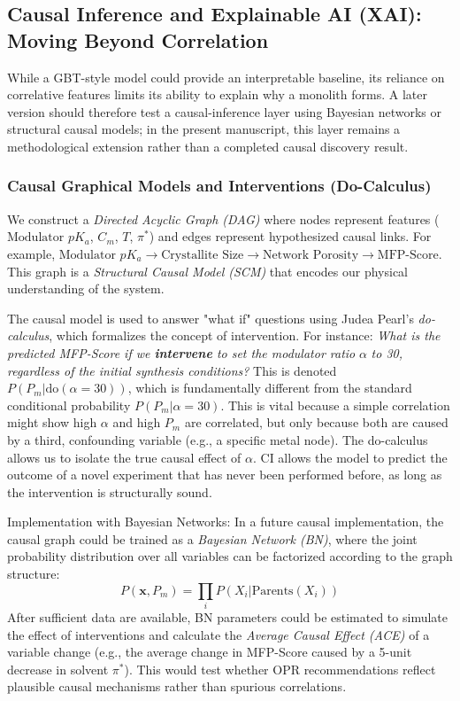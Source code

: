 \documentclass[12pt,a4paper]{article}
\begin{document}
\subsection{Causal Inference and Explainable AI (XAI): Moving Beyond Correlation}

While a GBT-style model could provide an interpretable baseline, its reliance on correlative features limits its ability to explain why a monolith forms. A later version should therefore test a causal-inference layer using Bayesian networks or structural causal models; in the present manuscript, this layer remains a methodological extension rather than a completed causal discovery result.\cite{ref20}

\subsubsection{Causal Graphical Models and Interventions (Do-Calculus)}

We construct a \textit{Directed Acyclic Graph (DAG)} where nodes represent features ($\text{Modulator } pK_a$, $C_m$, $T$, $\pi^*$) and edges represent hypothesized causal links. For example, $\text{Modulator } pK_a \rightarrow \text{Crystallite Size} \rightarrow \text{Network Porosity} \rightarrow \text{MFP-Score}$. This graph is a \textit{Structural Causal Model (SCM)} that encodes our physical understanding of the system.

The causal model is used to answer "what if" questions using Judea Pearl's \textit{do-calculus}, which formalizes the concept of intervention. For instance: \textit{What is the predicted MFP-Score if we \textbf{intervene} to set the modulator ratio} $\alpha$ \textit{to 30, regardless of the initial synthesis conditions?} This is denoted $P(P_m | \text{do}(\alpha=30))$, which is fundamentally different from the standard conditional probability $P(P_m | \alpha=30)$. This is vital because a simple correlation might show high $\alpha$ and high $P_m$ are correlated, but only because both are caused by a third, confounding variable (e.g., a specific metal node). The do-calculus allows us to isolate the true causal effect of $\alpha$. CI allows the model to predict the outcome of a novel experiment that has never been performed before, as long as the intervention is structurally sound.

Implementation with Bayesian Networks:
In a future causal implementation, the causal graph could be trained as a \textit{Bayesian Network (BN)}, where the joint probability distribution over all variables can be factorized according to the graph structure:
\[
P(\mathbf{x}, P_m) = \prod_{i} P(X_i | \text{Parents}(X_i))
\]
After sufficient data are available, BN parameters could be estimated to simulate the effect of interventions and calculate the \textit{Average Causal Effect (ACE)} of a variable change (e.g., the average change in MFP-Score caused by a 5-unit decrease in solvent $\pi^*$). This would test whether OPR recommendations reflect plausible causal mechanisms rather than spurious correlations.
\end{document}
